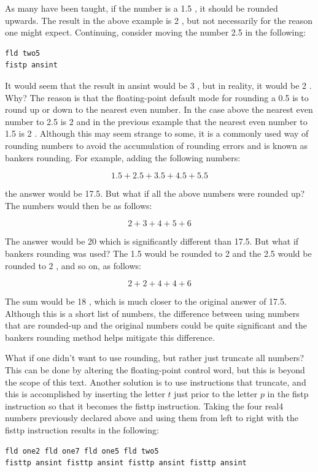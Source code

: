 \documentclass[10pt]{book}
\begin{document}
As many have been taught, if the number is a 1.5 , it should be rounded upwards. The result in the above example is 2 , but not necessarily for the reason one might expect. Continuing, consider moving the number 2.5 in the following:

\begin{verbatim}
fld two5
fistp ansint
\end{verbatim}

It would seem that the result in ansint would be 3 , but in reality, it would be 2 . Why? The reason is that the floating-point default mode for rounding a 0.5 is to round up or down to the nearest even number. In the case above the nearest even number to 2.5 is 2 and in the previous example that the nearest even number to 1.5 is 2 . Although this may seem strange to some, it is a commonly used way of rounding numbers to avoid the accumulation of rounding errors and is known as bankers rounding. For example, adding the following numbers:

$$
1.5+2.5+3.5+4.5+5.5
$$

the answer would be 17.5. But what if all the above numbers were rounded up? The numbers would then be as follows:

$$
2+3+4+5+6
$$

The answer would be 20 which is significantly different than 17.5. But what if bankers rounding was used? The 1.5 would be rounded to 2 and the 2.5 would be rounded to 2 , and so on, as follows:

$$
2+2+4+4+6
$$

The sum would be 18 , which is much closer to the original answer of 17.5. Although this is a short list of numbers, the difference between using numbers that are rounded-up and the original numbers could be quite significant and the bankers rounding method helps mitigate this difference.

What if one didn't want to use rounding, but rather just truncate all numbers? This can be done by altering the floating-point control word, but this is beyond the scope of this text. Another solution is to use instructions that truncate, and this is accomplished by inserting the letter $t$ just prior to the letter $p$ in the fistp instruction so that it becomes the fisttp instruction. Taking the four real4 numbers previously declared above and using them from left to right with the fisttp instruction results in the following:


\begin{verbatim}
fld one2 fld one7 fld one5 fld two5
fisttp ansint fisttp ansint fisttp ansint fisttp ansint
\end{verbatim}
\end{document}
